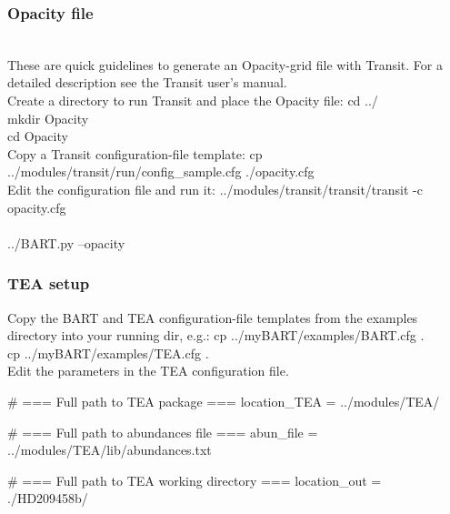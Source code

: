 \documentclass[letterpaper, 12pt]{article}
\begin{document}

\subsubsection{Opacity file}

 \\

These are quick guidelines to generate an Opacity-grid file with
Transit.  For a detailed description see the Transit user's manual. \\

Create a directory to run Transit and place the Opacity file: \newline
{\tttb cd ../}        \\
{\tttb mkdir Opacity} \\
{\tttb cd Opacity}    \\

Copy a Transit configuration-file template: \newline
{\tttb cp ../modules/transit/run/config\_sample.cfg ./opacity.cfg}  \\

Edit the configuration file and run it: \newline
{\tttb ../modules/transit/transit/transit -c opacity.cfg}  \\

 \\
{\tttb ../BART.py --opacity}  \\


\subsubsection{TEA setup}

Copy the BART and TEA configuration-file templates from the examples
directory into your running dir, e.g.: \newline
{\tttb cp ../myBART/examples/BART.cfg .}  \\
{\tttb cp ../myBART/examples/TEA.cfg .}   \\

Edit the parameters in the TEA configuration file. 
\begin{plain}
# === Full path to TEA package ===
location_TEA = ../modules/TEA/

# === Full path to abundances file ===
abun_file = ../modules/TEA/lib/abundances.txt

# === Full path to TEA working directory ===
location_out = ./HD209458b/
\end{plain}
\end{document}
